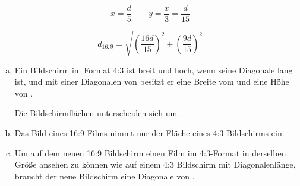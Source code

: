 \begin{exercise}
\begin{enumerate}[a)]
\begin{minipage}{6.2cm}
            \end{minipage}%
            \hfill
            \begin{minipage}{20em}
              \setlength{\abovedisplayskip}{0pt}%
              \begin{equation*}
                x=\frac{d}{5}
                \qquad
                y=\frac{x}{3}=\frac{d}{15}
              \end{equation*}\par
              \begin{equation*}
                d_{16:9}=
                  \sqrt{
                    \left(\frac{16d}{15}\right)^2
                    +
                    \left(\frac{9d}{15}\right)^2
                  }
              \end{equation*}
            \end{minipage}
    \end{enumerate}
  \fi
  \ifoutcome\outcome
    \begin{enumerate}[a)]
      \item Ein Bildschirm im Format 4:3 ist  breit und  hoch,
            wenn seine Diagonale  lang ist, und mit einer Diagonalen von
             besitzt er eine Breite vom  und eine Höhe von
            .\par
            Die Bildschirmflächen unterscheiden sich um .
      \item Das Bild eines 16:9 Films nimmt nur  der
            Fläche eines 4:3 Bildschirms ein.
      \item Um auf dem neuen 16:9 Bildschirm einen Film im 4:3-Format in derselben Größe
            ansehen zu können wie auf einem 4:3 Bildschirm mit  Diagonalenlänge,
            braucht der neue Bildschirm eine Diagonale von .
    \end{enumerate}
  \fi
\end{exercise}
